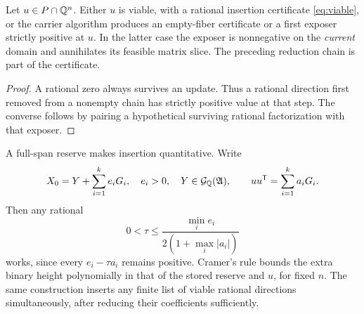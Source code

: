 \begin{corollary}\label{cor:insertion}
Let $u\in P\cap\mathbb Q^n$. Either $u$ is viable, with a rational insertion certificate \eqref{eq:viable}, or the carrier algorithm produces an empty-fiber certificate or a first exposer strictly positive at $u$. In the latter case the exposer is nonnegative on the \emph{current} domain and annihilates its feasible matrix slice. The preceding reduction chain is part of the certificate.
\end{corollary}
\begin{proof}
A rational zero always survives an update. Thus a rational direction first removed from a nonempty chain has strictly positive value at that step. The converse follows by pairing a hypothetical surviving rational factorization with that exposer.
\end{proof}

A full-span reserve makes insertion quantitative. Write
\[
 X_0=Y+\sum_{i=1}^k e_iG_i,\quad e_i>0,\quad Y\in\mathcal G_{\mathbb Q}(\mathfrak A),\qquad uu^{\mathsf T}=\sum_{i=1}^ka_iG_i.
\]
Then any rational
\begin{equation}\label{eq:tauinsert}
 0<\tau\le\frac{\min_i e_i}{2(1+\max_i|a_i|)}
\end{equation}
works, since every $e_i-\tau a_i$ remains positive. Cramer's rule bounds the extra binary height polynomially in that of the stored reserve and $u$, for fixed $n$. The same construction inserts any finite list of viable rational directions simultaneously, after reducing their coefficients sufficiently.

